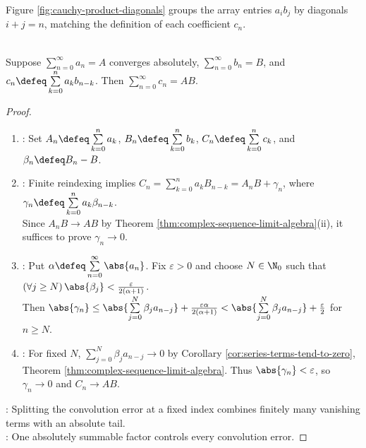 Figure \ref{fig:cauchy-product-diagonals} groups the array entries $a_i b_j$ by diagonals $i+j=n$, matching the definition of each coefficient $c_n$.

\begin{illustrationfigure}[H]
  \centering
  
  \caption{Diagonal sums of $(a_i b_j)$ form the Cauchy product; finite rectangular sums are order-free.}
  \label{fig:cauchy-product-diagonals}
\end{illustrationfigure}

\begin{theorem} \label{thm:mertens-cauchy-product} \\
Suppose $\sum\limits_{n=0}^{\infty}a_n=A$ converges absolutely, $\sum\limits_{n=0}^{\infty}b_n=B$, and $c_n\defeq\sum\limits_{k=0}^{n}a_kb_{n-k}$. Then $\sum\limits_{n=0}^{\infty}c_n=AB$.
\begin{proof}
\begin{enumerate}[label=(\roman*)]
\setlength{\itemsep}{0pt}
\item {}: Set $A_n\defeq\sum\limits_{k=0}^{n}a_k$, $B_n\defeq\sum\limits_{k=0}^{n}b_k$, $C_n\defeq\sum\limits_{k=0}^{n}c_k$, and $\beta_n\defeq B_n-B$.
\item {}: Finite reindexing implies $C_n=\sum\limits_{k=0}^{n}a_kB_{n-k}=A_nB+\gamma_n$, where $\gamma_n\defeq\sum\limits_{k=0}^{n}a_k\beta_{n-k}$.\\
Since $A_nB\to AB$ by Theorem \ref{thm:complex-sequence-limit-algebra}(ii), it suffices to prove $\gamma_n\to0$.
\item {}: Put $\alpha\defeq\sum\limits_{n=0}^{\infty}\abs{a_n}$. Fix $\varepsilon>0$ and choose $N\in\N_0$ such that $(\forall j\geq N)\,\abs{\beta_j}<\frac{\varepsilon}{2(\alpha+1)}$.\\
Then $\abs{\gamma_n}\leq\abs{\sum\limits_{j=0}^{N}\beta_j a_{n-j}}+\frac{\varepsilon\alpha}{2(\alpha+1)}<\abs{\sum\limits_{j=0}^{N}\beta_j a_{n-j}}+\frac{\varepsilon}{2}$ for $n\geq N$.
\item {}: For fixed $N$, $\sum\limits_{j=0}^{N}\beta_j a_{n-j}\to0$ by Corollary \ref{cor:series-terms-tend-to-zero}, Theorem \ref{thm:complex-sequence-limit-algebra}. Thus $\abs{\gamma_n}<\varepsilon$, so $\gamma_n\to0$ and $C_n\to AB$.
\end{enumerate}
: Splitting the convolution error at a fixed index combines finitely many vanishing terms with an absolute tail.\\
: One absolutely summable factor controls every convolution error.
\end{proof}
\end{theorem}

